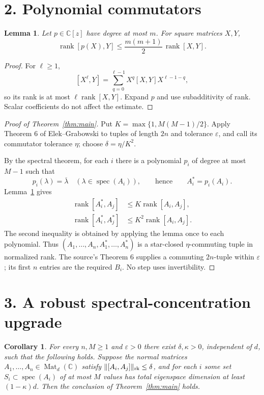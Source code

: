 \documentclass[10pt,a4paper]{article}
\newtheorem{corollary}{Corollary}
\newtheorem{lemma}{Lemma}
\newcommand{\C}{\mathbb C}
\newcommand{\Mat}{\operatorname{Mat}}
\newcommand{\rk}{\operatorname{rank}}
\newcommand{\spec}{\operatorname{spec}}
\begin{document}
\section*{2. Polynomial commutators}

\begin{lemma}\label{lem:poly}
Let $p\in\C[z]$ have degree at most $m$.  For square matrices $X,Y$,
\[
 \rk[p(X),Y]\le \frac{m(m+1)}2\,\rk[X,Y].
\]
\end{lemma}

\begin{proof}
For $\ell\ge1$,
\[
 [X^\ell,Y]=\sum_{q=0}^{\ell-1}X^q[X,Y]X^{\ell-1-q},
\]
so its rank is at most $\ell\rk[X,Y]$.  Expand $p$ and use subadditivity of
rank.  Scalar coefficients do not affect the estimate.
\end{proof}

\begin{proof}[Proof of Theorem~\ref{thm:main}]
Put $K=\max\{1,M(M-1)/2\}$.  Apply Theorem 6 of Elek--Grabowski to tuples
of length $2n$ and tolerance $\varepsilon$, and call its commutator tolerance
$\eta$; choose $\delta=\eta/K^2$.

By the spectral theorem, for each $i$ there is a polynomial $p_i$ of degree
at most $M-1$ such that
\[
 p_i(\lambda)=\overline\lambda\quad(\lambda\in\spec(A_i)),
 \qquad\text{hence}\qquad A_i^*=p_i(A_i).
\]
Lemma~\ref{lem:poly} gives
\begin{align*}
 \rk[A_i^*,A_j]&\le K\rk[A_i,A_j],\\
 \rk[A_i^*,A_j^*]&\le K^2\rk[A_i,A_j].
\end{align*}
The second inequality is obtained by applying the lemma once to each
polynomial.  Thus
$(A_1,\ldots,A_n,A_1^*,\ldots,A_n^*)$ is a star-closed
$\eta$-commuting tuple in normalized rank.  The source's Theorem 6 supplies
a commuting $2n$-tuple within $\varepsilon$; its first $n$ entries are the
required $B_i$.  No step uses invertibility.
\end{proof}

\section*{3. A robust spectral-concentration upgrade}

\begin{corollary}\label{cor:concentration}
For every $n,M\ge1$ and $\varepsilon>0$ there exist $\delta,\kappa>0$,
independent of $d$, such that the following holds.  Suppose the normal
matrices $A_1,\ldots,A_n\in\Mat_d(\C)$ satisfy
$\|[A_i,A_j]\|_{\rm rk}\le\delta$, and for each $i$ some set
$S_i\subset\spec(A_i)$ of at most $M$ values has total eigenspace dimension
at least $(1-\kappa)d$.  Then the conclusion of Theorem~\ref{thm:main} holds.
\end{corollary}
\end{document}
